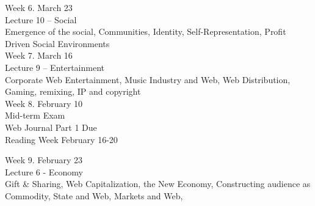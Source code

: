 \documentclass[10pt]{article}
\begin{document}
{Week 6. March 23 \\
Lecture 10 – Social \\
Emergence of the social, Communities, Identity, Self-Representation, Profit Driven Social Environments \\

Week 7. March 16 \\
Lecture 9 – Entertainment \\
Corporate Web Entertainment, Music Industry and Web, Web Distribution, Gaming, remixing, IP and copyright \\

Week 8. February 10 \\
Mid-term Exam \\
Web Journal Part 1 Due \\

Reading Week February 16-20

Week 9. February 23 \\
Lecture 6 - Economy \\
Gift \& Sharing, Web Capitalization, the New Economy, Constructing audience as Commodity, State and Web, Markets and Web, \\

}
\end{document}
